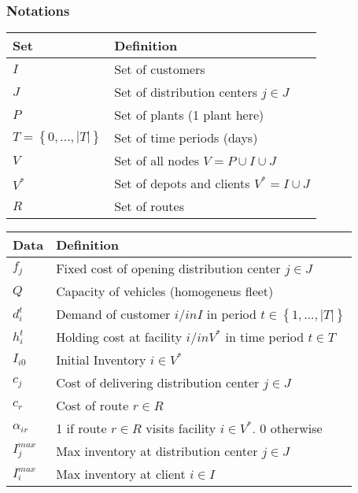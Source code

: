\documentclass[12pt, a4paper]{article}
\begin{document}
\subsubsection{Notations}\label{notations}
\begin{tabular}{ll}
\hline
Set & Definition \\
\hline
$I$ & Set of customers\\ 
$J$ & Set of distribution centers $j\in J$\\
$P$ & Set of plants (1 plant here)\\
$T=\left \{0,...,|T|\right \}$ & Set of time periods (days)\\
$V$ & Set of all nodes $V=P\cup I \cup J$\\
$V^*$ & Set of depots and clients $V^*=I \cup J$\\
$R$ & Set of routes\\
\hline
\end{tabular}
\newpage
\begin{tabular}{ll}
\hline
Data & Definition \\
\hline
$f_j$ & Fixed cost of opening distribution center $j\in J$\\ 
$Q$ & Capacity of vehicles (homogeneus fleet)\\ 
$d^t_i$ & Demand of customer $i /in I$ in period $t \in \left \{1,...,|T| \right \}$\\
$h^t_i$ & Holding cost at facility $i /in V^*$ in time period $t\in T$\\
$I_{i0}$ & Initial Inventory $i \in V^*$\\
$c_j$ & Cost of delivering distribution center $j\in J$ \\
$c_r$ & Cost of route $r\in R$\\
$\alpha_{ir}$ & 1 if route $r \in R$ visits facility $i\in V^*$. 0 otherwise\\
$I^{max}_j$ & Max inventory at distribution center $j \in J$\\
$I^{max}_i$ & Max inventory at client $i \in I$\\
\hline
\end{tabular}
\end{document}
